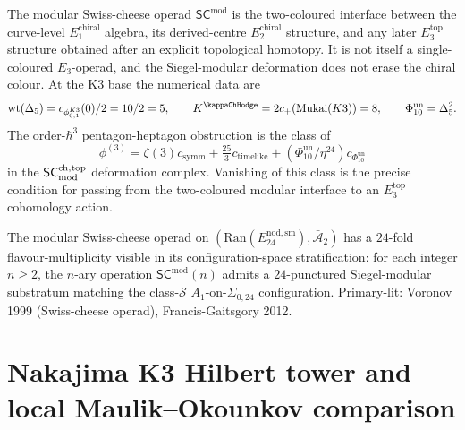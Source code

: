 \begin{remark}
\label{rem:msco-deep-1}
The modular Swiss-cheese operad $\mathsf{SC}^{\mathrm{mod}}$ is the
two-coloured interface between the curve-level
$E_1^{\mathrm{chiral}}$ algebra, its derived-centre
$E_2^{\mathrm{chiral}}$ structure, and any later
$E_3^{\mathrm{top}}$ structure obtained after an explicit
topological homotopy. It is not itself a single-coloured
$E_3$-operad, and the Siegel-modular deformation does not erase the
chiral colour. At the K3 base the numerical data are
\[
 \operatorname{wt}(\Delta_5)
 = c_{\phi_{0,1}^{K3}}(0)/2 = 10/2 = 5,\qquad
 K^{\kappaChHodge}=2c_+(\mathrm{Mukai}(K3))=8,
 \qquad
 \Phi_{10}^{\mathrm{un}}=\Delta_5^2.
\]
The order-$\hbar^3$ pentagon-heptagon obstruction is the class of
\[
 \phi^{(3)}
 = \zeta(3)c_{\mathrm{symm}}
 + \tfrac{25}{3}c_{\mathrm{timelike}}
 + (\Phi_{10}^{\mathrm{un}}/\eta^{24})c_{\Phi_{10}^{\mathrm{un}}}
\]
in the $\mathsf{SC}^{\mathrm{ch,top}}_{\mathrm{mod}}$ deformation complex. Vanishing of this class is the
precise condition for passing from the two-coloured modular interface
to an $E_3^{\mathrm{top}}$ cohomology action.
\end{remark}

\begin{remark}
\label{rem:msco-deep-2}
The modular Swiss-cheese operad on
$(\mathrm{Ran}(E^{\mathrm{nod,sm}}_{24}),\bar{\mathcal A}_2)$ has a
$24$-fold flavour-multiplicity visible in its configuration-space
stratification: for each integer $n\ge 2$, the $n$-ary operation
$\mathsf{SC}^{\mathrm{mod}}(n)$ admits a $24$-punctured Siegel-modular
substratum matching the class-$\mathcal S$ $A_1$-on-$\Sigma_{0,24}$
configuration. Primary-lit: Voronov 1999 (Swiss-cheese operad),
Francis-Gaitsgory 2012.
\end{remark}

\section{Nakajima K3 Hilbert tower and local Maulik--Okounkov comparison}
\label{sec:msco-MO-yangian-K3-hilb}


